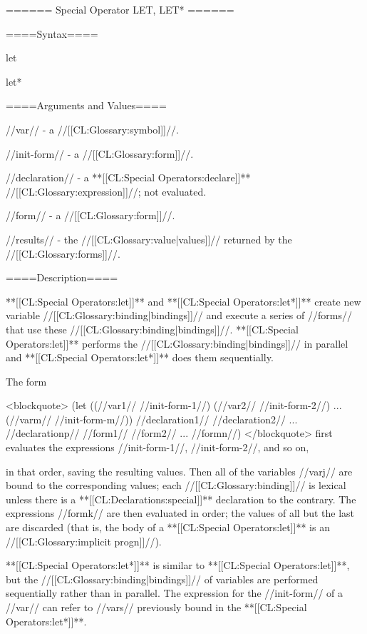 ====== Special Operator LET, LET* ======

====Syntax====

\DefspecWithValues let {\paren{\star{\VarValue}}  } {}

\DefspecWithValues let* {\paren{\star{\VarValue}}  } {}

====Arguments and Values====

//var// - a //[[CL:Glossary:symbol]]//.

//init-form// - a //[[CL:Glossary:form]]//.

//declaration// - a **[[CL:Special Operators:declare]]** //[[CL:Glossary:expression]]//; not evaluated.

//form// - a //[[CL:Glossary:form]]//.

//results// - the //[[CL:Glossary:value|values]]// returned by the //[[CL:Glossary:forms]]//.

====Description====

**[[CL:Special Operators:let]]** and **[[CL:Special Operators:let*]]** create new variable //[[CL:Glossary:binding|bindings]]// and execute a series of //forms// that use these //[[CL:Glossary:binding|bindings]]//. **[[CL:Special Operators:let]]** performs the //[[CL:Glossary:binding|bindings]]// in parallel and **[[CL:Special Operators:let*]]** does them sequentially.


The form

<blockquote> (let ((//var1// //init-form-1//) (//var2// //init-form-2//) ... (//varm// //init-form-m//)) //declaration1// //declaration2// ... //declarationp// //form1// //form2// ... //formn//) </blockquote> first evaluates the expressions //init-form-1//, //init-form-2//, and so on,

in that order, saving the resulting values. Then all of the variables //varj// are bound to the corresponding values; each //[[CL:Glossary:binding]]// is lexical unless there is a **[[CL:Declarations:special]]** declaration to the contrary. The expressions //formk// are then evaluated in order; the values of all but the last are discarded (that is, the body of a **[[CL:Special Operators:let]]** is an //[[CL:Glossary:implicit progn]]//).

**[[CL:Special Operators:let*]]** is similar to **[[CL:Special Operators:let]]**, but the //[[CL:Glossary:binding|bindings]]// of variables are performed sequentially rather than in parallel. The expression for the //init-form// of a //var// can refer to //vars// previously bound in the **[[CL:Special Operators:let*]]**.


